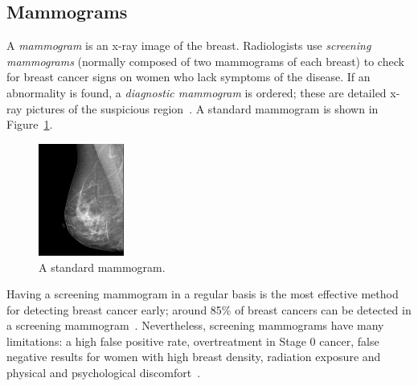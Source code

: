 \subsection{Mammograms}
A \emph{mammogram} is an x-ray image of the breast. Radiologists use \emph{screening mammograms} (normally composed of two mammograms of each breast) to check for breast cancer signs on women who lack symptoms of the disease. If an abnormality is found, a \emph{diagnostic mammogram} is ordered; these are detailed x-ray pictures of the suspicious region~\cite{NCI2014}. A standard mammogram is shown in Figure~\ref{fig:normalMammogram}.

\begin{figure}[h]
	\centering
	\includegraphics[width = 0.25\textwidth]{plots/normalMammogram.jpg}
	\caption[A digital mammogram]{A standard mammogram.}
	\label{fig:normalMammogram}
\end{figure}

Having a screening mammogram in a regular basis is the most effective method for detecting breast cancer early; around 85\% of breast cancers can be detected in a screening mammogram~\cite{BCSC2013}. Nevertheless, screening mammograms have many limitations: a high false positive rate, overtreatment in Stage 0 cancer, false negative results for women with high breast density, radiation exposure and physical and psychological discomfort~\cite{NCI2014}.

